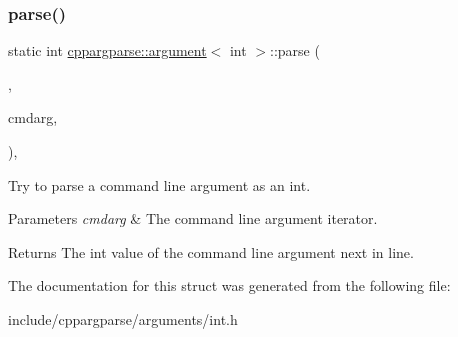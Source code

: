\subsubsection{\texorpdfstring{parse()}{parse()}}
{\footnotesize\ttfamily static int \hyperlink{structcppargparse_1_1argument}{cppargparse\+::argument}$<$ int $>$\+::parse (\begin{DoxyParamCaption}\item[{const types\+::\+Command\+Line\+\_\+t \&}]{,  }\item[{const types\+::\+Command\+Line\+Argument\+\_\+t \&}]{cmdarg,  }\item[{const types\+::\+Command\+Line\+Arguments\+Map\+\_\+t \&}]{ }\end{DoxyParamCaption})\hspace{0.3cm}{\ttfamily [inline]}, {\ttfamily [static]}}



Try to parse a command line argument as an int. 


\begin{DoxyParams}{Parameters}
{\em cmdarg} & The command line argument iterator.\\
\hline
\end{DoxyParams}
\begin{DoxyReturn}{Returns}
The int value of the command line argument next in line. 
\end{DoxyReturn}


The documentation for this struct was generated from the following file\+:\begin{DoxyCompactItemize}
\item 
include/cppargparse/arguments/int.\+h\end{DoxyCompactItemize}
